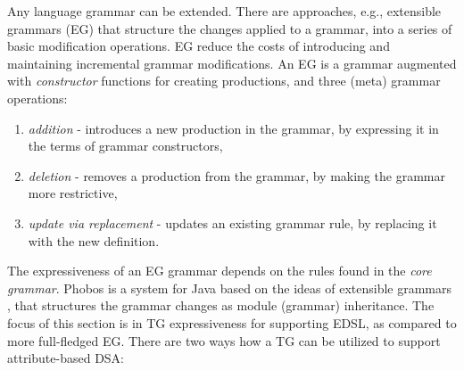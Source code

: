 Any language grammar can be extended. There are approaches, e.g., extensible grammars (EG) \cite{cardelli94extensible} that structure the changes applied to a grammar, into a series of basic modification operations. EG reduce the costs of introducing and maintaining incremental grammar modifications. An EG is a grammar augmented with \textit{constructor} functions for creating productions, and three (meta) grammar operations:
\begin{enumerate}[1.]
\item \textit{addition} - introduces a new production in the grammar, by expressing it in the terms of grammar constructors,
\item \textit{deletion} - removes a production from the grammar, by making the grammar more restrictive,
\item \textit{update via replacement} - updates an existing grammar rule, by replacing it with the new definition. 
\end{enumerate} 

The expressiveness of an EG grammar depends on the rules found in the \textit{core grammar}. Phobos \cite{java.phobos} is a system for Java based on the ideas of extensible grammars \cite{cardelli94extensible}, that structures the grammar changes as module (grammar) inheritance. The focus of this section is in TG expressiveness for supporting EDSL, as compared to more full-fledged EG. There are two ways how a TG can be utilized to support attribute-based DSA:

